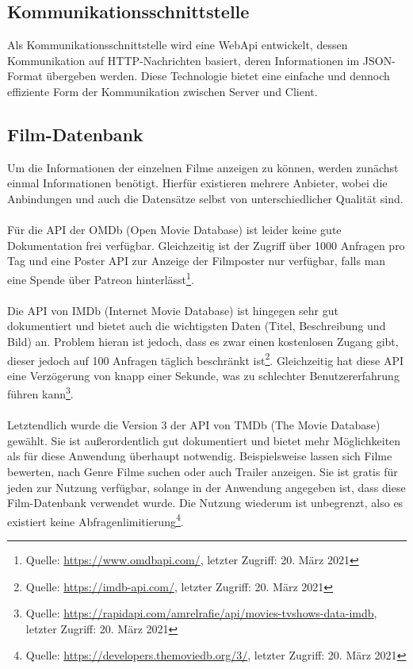 \subsection{Kommunikationsschnittstelle}
Als Kommunikationsschnittstelle wird eine WebApi entwickelt, dessen Kommunikation auf HTTP-Nachrichten basiert, deren Informationen im JSON-Format übergeben werden. Diese Technologie bietet eine einfache und dennoch effiziente Form der Kommunikation zwischen Server und Client.

\subsection{Film-Datenbank}
\label{sec:filmdatenbank}
Um die Informationen der einzelnen Filme anzeigen zu können, werden zunächst einmal Informationen benötigt.
Hierfür existieren mehrere Anbieter, wobei die Anbindungen und auch die Datensätze selbst von unterschiedlicher Qualität sind.\\
\\
Für die API der OMDb (Open Movie Database) ist leider keine gute Dokumentation frei verfügbar.
Gleichzeitig ist der Zugriff über 1000 Anfragen pro Tag und eine Poster API zur Anzeige der Filmposter nur verfügbar, falls man eine Spende über Patreon hinterlässt\footnote{Quelle: \url{https://www.omdbapi.com/}, letzter Zugriff: 20. März 2021}.\\
\\
Die API von IMDb (Internet Movie Database) ist hingegen sehr gut dokumentiert und bietet auch die wichtigsten Daten (Titel, Beschreibung und Bild) an.
Problem hieran ist jedoch, dass es zwar einen kostenlosen Zugang gibt, dieser jedoch auf 100 Anfragen täglich beschränkt ist\footnote{Quelle: \url{https://imdb-api.com/}, letzter Zugriff: 20. März 2021}. 
Gleichzeitig hat diese API eine Verzögerung von knapp einer Sekunde, was zu schlechter Benutzererfahrung führen kann\footnote{Quelle: \url{https://rapidapi.com/amrelrafie/api/movies-tvshows-data-imdb}, letzter Zugriff: 20. März 2021}.\\
\\
Letztendlich wurde die Version 3 der API von TMDb (The Movie Database) gewählt.
Sie ist außerordentlich gut dokumentiert und bietet mehr Möglichkeiten als für diese Anwendung überhaupt notwendig.
Beispielsweise lassen sich Filme bewerten, nach Genre Filme suchen oder auch Trailer anzeigen.
Sie ist gratis für jeden zur Nutzung verfügbar, solange in der Anwendung angegeben ist, dass diese Film-Datenbank verwendet wurde.
Die Nutzung wiederum ist unbegrenzt, also es existiert keine Abfragenlimitierung\footnote{Quelle: \url{https://developers.themoviedb.org/3/}, letzter Zugriff: 20. März 2021}.
